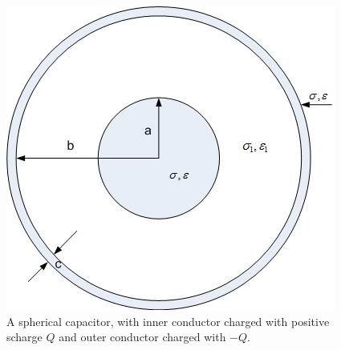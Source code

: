 \documentclass{ximera}
\begin{document}
\begin{figure}[htbp]
\begin{center}
\includegraphics[scale=1]{../jpg/sphereandcylcc.jpg}
\end{center}
\caption{A spherical capacitor, with inner conductor charged with positive scharge $Q$ and outer conductor charged with $-Q.$}
\label{fig:sphericalCapacitor}
\end{figure}
\end{document}
